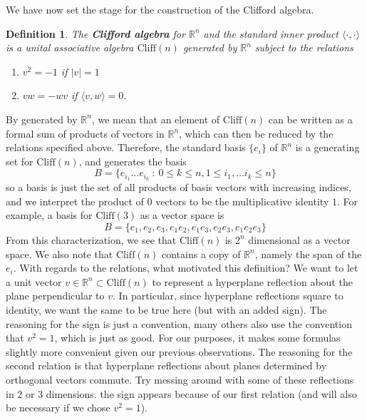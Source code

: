 \documentclass{article}
\newcommand{\R}{\mathbb{R}}
\newtheorem{definition}{Definition}[subsection]
\begin{document}
We have now set the stage for the construction of the Clifford algebra.
\begin{definition}
The \textbf{Clifford algebra} for $\R^n$ and the standard inner product $\langle \cdot,\cdot \rangle$ is a unital associative algebra $\mathrm{Cliff}(n)$ generated by $\R^n$ subject to the relations
\begin{enumerate}
\item $v^2 = -1$ if $|v| = 1$
\item $vw = -wv$ if $\langle v,w \rangle = 0$.
\end{enumerate}
\end{definition}
By generated by $\R^n$, we mean that an element of $\mathrm{Cliff}(n)$ can be written as a formal sum of products of vectors in $\R^n$, which can then be reduced by the relations specified above. Therefore, the standard basis $\{e_i\}$ of $\R^n$ is a generating set for $\mathrm{Cliff}(n)$, and generates the basis 
$$B = \{e_{i_1} \ldots e_{i_k} ~:~ 0 \leq k \leq n, 1 \leq i_1, \ldots i_k \leq n\} $$
so a basis is just the set of all products of basis vectors with increasing indices, and we interpret the product of $0$ vectors to be the multiplicative identity $1$. For example, a basis for $\mathrm{Cliff}(3)$ as a vector space is 
$$B = \{e_1, e_2, e_3, e_1e_2, e_1e_3, e_2e_3, e_1e_2e_3\} $$
From this characterization, we see that $\mathrm{Cliff}(n)$ is $2^n$ dimensional as a vector space. We also note that $\mathrm{Cliff}(n)$ contains a copy of $\R^n$, namely the span of the $e_i$. With regards to the relations, what motivated this definition? We want to let a unit vector $v \in \R^n \subset \mathrm{Cliff}(n)$ to represent a hyperplane reflection about the plane perpendicular to $v$. In particular, since hyperplane reflections square to identity, we want the same to be true here (but with an added sign). The reasoning for the sign is just a convention, many others also use the convention that $v^2 = 1$, which is just as good. For our purposes, it makes some formulas slightly more convenient given our previous observations. The reasoning for the second relation is that hyperplane reflections about planes determined by orthogonal vectors commute. Try messing around with some of these reflections in $2$ or $3$ dimensions. the sign appears because of our first relation (and will also be necessary if we chose $v^2 = 1$).
\end{document}
